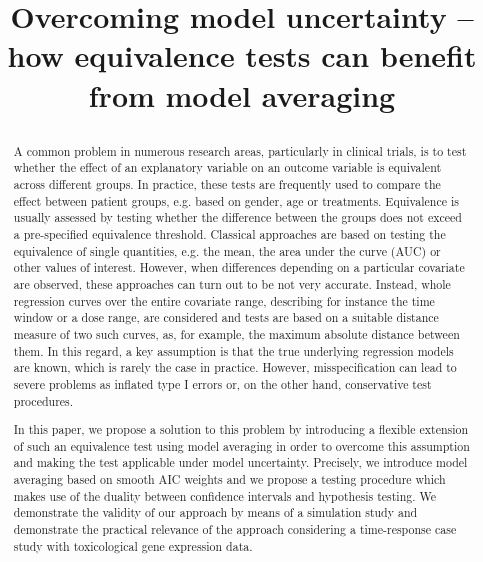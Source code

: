 
\title{{\bf \Large Overcoming model uncertainty -- how equivalence tests can benefit from model averaging
}
\maketitle

\begin{abstract}
    A common problem in numerous research areas, particularly in clinical trials, is to test whether the effect of an explanatory variable on an outcome variable is equivalent across different groups. In practice, these tests are frequently used to compare the effect between patient groups, e.g. based on gender, age or treatments. Equivalence is usually assessed by testing whether the difference between the groups does not exceed a pre-specified equivalence threshold. 
    Classical approaches are based on testing the equivalence of single quantities, e.g. the mean, the area under the curve (AUC) or other values of interest. However, when differences depending on a particular covariate are observed, these approaches can turn out to be not very accurate. Instead, whole regression curves over the entire covariate range, describing for instance the time window or a dose range, are considered and tests are based on a suitable distance measure of two such curves, as, for example, the maximum absolute distance between them.
    In this regard, a key assumption is that the true underlying regression models are known, which is rarely the case in practice. However, misspecification can lead to severe problems as inflated type I errors or, on the other hand, conservative test procedures.

    In this paper, we propose a solution to this problem by introducing a flexible extension of such an equivalence test using model averaging in order to overcome this assumption and making the test applicable under model uncertainty. Precisely, we introduce model averaging based on smooth AIC weights and we propose a testing procedure which makes use of the duality between confidence intervals and hypothesis testing. We demonstrate the validity of our approach by means of a simulation study and demonstrate the practical relevance of the approach considering a time-response case study with toxicological gene expression data.
\end{abstract}

}
